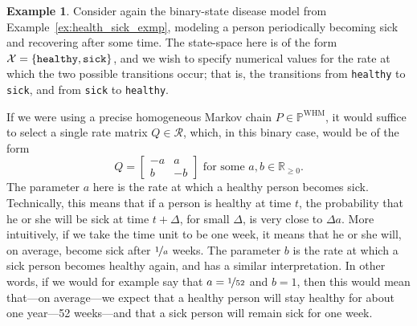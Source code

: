 \documentclass[10pt,a4paper]{paper}
\theoremstyle{definition}
\newtheorem{exmp}{Example}%
\newcommand{\reals}{\mathbb{R}}
\newcommand{\states}{\mathcal{X}}
\newcommand{\processes}{\mathbb{P}}
\newcommand{\whmprocesses}{\processes^{\mathrm{WHM}}}
\begin{document}
\begin{exmp}\label{exmp:example_rateset_simple_model}
Consider again the binary-state disease model from Example~\ref{ex:health_sick_exmp}, modeling a person periodically becoming sick and recovering after some time. The state-space here is of the form $\states=\{\text{{\tt healthy}},\text{{\tt sick}}\}$, and we wish to specify numerical values for the rate at which the two possible transitions occur; that is, the transitions from {\tt healthy} to {\tt sick}, and from {\tt sick} to {\tt healthy}.

If we were using a precise homogeneous Markov chain $P\in\whmprocesses$, it would suffice to select a single rate matrix $Q\in\mathcal{R}$, which, in this binary case, would be of the form
\begin{equation*}
Q = \left[ \begin{array}{rr}
-a & a \\
b & -b
\end{array}\right] \text{ for some } a,b\in\reals_{\geq0}.
\end{equation*}
The parameter $a$ here is the rate at which a healthy person becomes sick.
Technically, this means that if a person is healthy at time $t$, the probability that he or she will be sick at time $t+\Delta$, for small $\Delta$, is very close to $\Delta a$. More intuitively, if we take the time unit to be one week, it means that he or she will, on average, become sick after $\nicefrac{1}{a}$ weeks. The parameter $b$ is the rate at which a sick person becomes healthy again, and has a similar interpretation. In other words, if we would for example say that $a=\nicefrac{1}{52}$ and $b=1$, then this would mean that---on average---we expect that a healthy person will stay healthy for about one year---52 weeks---and that a sick person will remain sick for one week.




\end{exmp}
\end{document}
